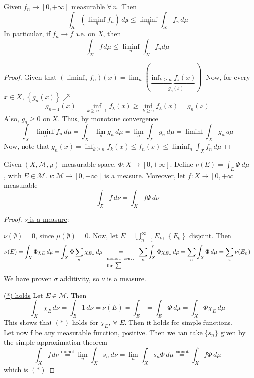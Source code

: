 \begin{lemma}
    Given \(f_n \to [0, +\infty]\) measurable \(\forall \, n\). Then 
    \[
        \int_X (\liminf_n f_n) \, d\mu \leq \liminf_n \int_X f_n \, d\mu
    \]
    In particular, if \(f_n \to f\) a.e. on \(X\), then
    \[
        \int_X f \, d\mu \leq \liminf_n \int_X f_n d\mu
    \]
\end{lemma}

\begin{proof}
    Given that \((\liminf_n f_n)(x) = \lim_n (\underbrace{\inf_{k \geq n} f_k(x)}_{= g_n (x)})\). Now, for every \(x \in X\), \(\left\{ g_n(x) \right\}\nearrow\)
    \[
        g_{n+1}(x) = \inf_{k \geq n+1} f_k(x) \geq \inf_{k \geq n} f_k(x) = g_n (x)
    \]
    Also, \(g_n \geq 0\) on \(X\). Thus, by monotone convergence
    \[
        \int_X \liminf_n f_n \, d\mu = \int_X \lim_n g_n \, d\mu = \lim_n \int_X g_n \, d\mu = \liminf \int_X g_n \, d\mu
    \]
    Now, note that \(g_n (x) = \inf_{k\geq n} f_k(x) \leq f_n(x) \leq \liminf_n \int_X f_n \, d\mu\) 
\end{proof}

\begin{theorem}
    Given \((X, \mathcal{M}, \mu)\) measurable space, \(\Phi : X \to [0, +\infty]\). Define \(\nu(E) = \int_E \Phi \, d\mu\), with \(E \in \mathcal{M}\). 
    \(\nu : \mathcal{M} \to [0, +\infty]\) is a measure. Moreover, let \(f:X \to [0, +\infty]\) measurable
    \[
        \int_X f \, d\nu = \int_X f\Phi \, d\nu \tag*{*}
    \]
\end{theorem}
\begin{proof}
    \underline{\(\nu\) is a measure}:  

    \(\nu(\emptyset) = 0\), since \(\mu(\emptyset) = 0\). 
    Now, let \(E = \bigcup_{n=1}^{\infty} E_k\), \(\left\{ E_k \right\}\) disjoint. Then 
    \[
        \nu(E) = \int_X \Phi\chi_{E} \, d\mu = \int_X \Phi\sum_n \chi_{E_n} \, d\mu \underset{\begin{array}{l} \text{\scriptsize{monot. conv.}} \\ 
            \text{\scriptsize{for }}\textstyle\sum\end{array}}{=}  \sum_n \int_X \Phi \chi_{E_n} \, d\mu = \sum_n \int_X \Phi \, d\mu = \sum_n \nu(E_n) 
    \]
    We have proven \(\sigma\) additivity, so \(\nu\) is a measure.

    \underline{(*) holds}
    Let \(E \in \mathcal{M}\). Then
    \[
        \int_X \chi_E \, d\nu = \int_E 1 \, d\nu = \nu(E) = \int_E = \int_E \Phi \, d\mu = \int_X \Phi \chi_E \, d\mu
    \]
    This shows that \((*)\) holds for \(\chi_E\), \(\forall \; E\). Then it holds for simple functions. \\
    Let now f be any measurable function, positive. Then we can take \(\{s_n\}\) given by the simple approximation theorem
    \[
        \int_X f \, d\nu \overset{\text{monot}}{=} \lim_n \int_X s_n \, d\nu = \lim_n \int_X s_n \Phi \, d\mu \overset{\text{monot}}{=} \int_X f \Phi \, d\mu 
    \]
    which is \((*)\) 
\end{proof}


